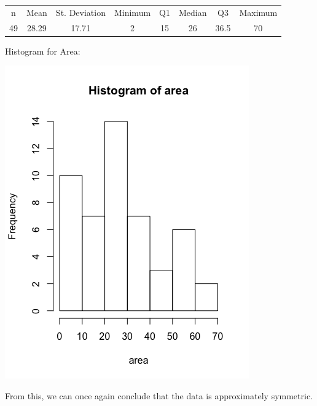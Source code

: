 \documentclass[11pt]{article}
\begin{document}
		\begin{center}
		\begin{tabular}{cccccccc}
			n & Mean & St. Deviation & Minimum & Q1 & Median & Q3 & Maximum\\
			49 & 28.29 & 17.71 & 2 & 15 & 26 & 36.5 & 70\\
		\end{tabular}\par
		\end{center}
		
		Histogram for Area:\par
		
		\begin{center}
		\includegraphics[scale=0.5]{images/areahist.png}
		\end{center}\par
		From this, we can once again conclude that the data is approximately symmetric.\par
		
\end{document}
